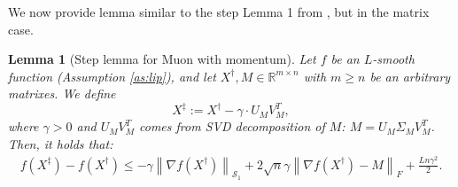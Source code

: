 \documentclass{article}
\theoremstyle{plain}
\newtheorem{lemma}[theorem]{Lemma}
\theoremstyle{definition}
\theoremstyle{remark}
\newcommand{\norm}[1]{\left\| #1 \right\|}
\begin{document}
    We now provide lemma similar to the step Lemma 1 from \cite{sun2023momentum}, but in the matrix case.
    \begin{lemma}[Step lemma for Muon with momentum]
        Let $f$ be an $L$-smooth function (Assumption \ref{as:lip}), and let  $X^\dagger, M \in \mathbb{R}^{m \times n}$ with $m \geq n$ be an arbitrary matrixes. We define
        \begin{equation*}
            X^\ddagger := X^\dagger - \gamma \cdot U_M V_M^T,
        \end{equation*}
        where $\gamma > 0$ and $U_M V_M^T$ comes from SVD decomposition of $M$: $M = U_M \Sigma_M V_M^T$. Then, it holds that:
        \begin{align*}
            f\left( X^\ddagger \right) - f\left( X^\dagger \right)
            \leq
            -\gamma \norm{\nabla f\left( X^\dagger \right)}_{\mathcal{S}_1}
            +
            2 \sqrt{n}\gamma \norm{\nabla f\left( X^\dagger \right) - M}_{F}
            +
            \frac{L n \gamma^2}{2}.
        \end{align*}
    \end{lemma}
\end{document}
